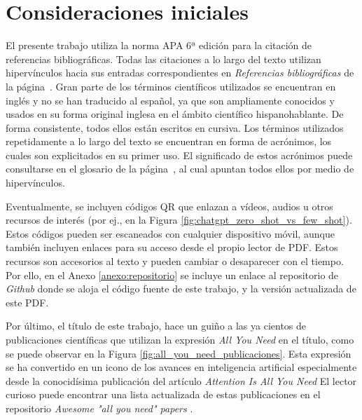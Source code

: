 \section{Consideraciones iniciales}

El presente trabajo utiliza la norma APA 6ª edición para la citación de referencias bibliográficas. Todas las citaciones a lo largo del texto utilizan hipervínculos hacia sus entradas correspondientes en \emph{Referencias bibliográficas} de la página~\pageref{chap:referencias}. Gran parte de los términos científicos utilizados se encuentran en inglés y no se han traducido al español, ya que son ampliamente conocidos y usados en su forma original inglesa en el ámbito científico hispanohablante. De forma consistente, todos ellos están escritos en cursiva. Los términos utilizados repetidamente a lo largo del texto se encuentran en forma de acrónimos, los cuales son explicitados en su primer uso. El significado de estos acrónimos puede consultarse en el glosario de la página~\pageref{chap:glosario}, al cual apuntan todos ellos por medio de hipervínculos.

Eventualmente, se incluyen códigos QR que enlazan a vídeos, audios u otros recursos de interés (por ej., en la Figura \ref{fig:chatgpt_zero_shot_vs_few_shot}). Estos códigos pueden ser escaneados con cualquier dispositivo móvil, aunque también incluyen enlaces para su acceso desde el propio lector de PDF. Estos recursos son accesorios al texto y pueden cambiar o desaparecer con el tiempo. Por ello, en el Anexo \ref{anexo:repositorio} se incluye un enlace al repositorio de \emph{Github} donde se aloja el código fuente de este trabajo, y la versión actualizada de este PDF.

Por último, el título de este trabajo, hace un guiño a las ya cientos de publicaciones científicas que utilizan la expresión \emph{All You Need} en el título, como se puede observar en la Figura \ref{fig:all_you_need_publicaciones}. Esta expresión se ha convertido en un icono de los avances en inteligencia artificial especialmente desde la conocidísima publicación del artículo \emph{Attention Is All You Need} \citep{vaswaniAttentionAllYou2017} El lector curioso puede encontrar una lista actualizada de estas publicaciones en el repositorio \emph{Awesome "all you need" papers} \citep{nishiKentoNishiAwesomeallyouneedpapers2024}.


